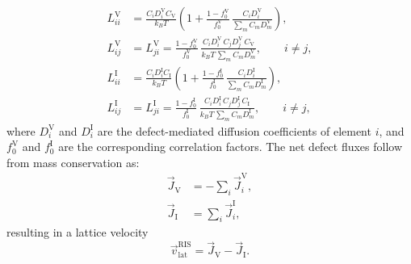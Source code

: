 \documentclass[3p,times]{elsarticle} %
\newcommand{\Vac}{\mathrm{V}}          %
\newcommand{\Int}{\mathrm{I}}          %
\newcommand{\lat}{\mathrm{lat}}
\begin{document}
\begin{align}
L_{ii}^{\Vac} &= \frac{C_iD_i^{\Vac}C_{\Vac}}{k_BT}
  \left(1+\frac{1-f_0^{\Vac}}{f_0^{\Vac}}\,
  \frac{C_iD_i^{\Vac}}{\sum_m C_mD_m^{\Vac}}\right),
\label{eq:onsager-vac-diag}\\
L_{ij}^{\Vac} &= L_{ji}^{\Vac}
  = \frac{1-f_0^{\Vac}}{f_0^{\Vac}}\,
    \frac{C_iD_i^{\Vac}\,C_jD_j^{\Vac}\,C_{\Vac}}
         {k_BT\,\sum_m C_mD_m^{\Vac}},
    \qquad i\neq j,
\label{eq:onsager-vac-off}\\
L_{ii}^{\Int} &= \frac{C_iD_i^{\Int}C_{\Int}}{k_BT}
  \left(1+\frac{1-f_0^{\Int}}{f_0^{\Int}}\,
  \frac{C_iD_i^{\Int}}{\sum_m C_mD_m^{\Int}}\right),
\label{eq:onsager-int-diag}\\
L_{ij}^{\Int} &= L_{ji}^{\Int}
  = \frac{1-f_0^{\Int}}{f_0^{\Int}}\,
    \frac{C_iD_i^{\Int}\,C_jD_j^{\Int}\,C_{\Int}}
         {k_BT\,\sum_m C_mD_m^{\Int}},
    \qquad i\neq j,
\label{eq:onsager-int-off}
\end{align}
where \(D_i^{\Vac}\) and \(D_i^{\Int}\) are the defect-mediated diffusion
coefficients of element \(i\), and \(f_0^{\Vac}\) and \(f_0^{\Int}\) are the
corresponding correlation factors. The net defect fluxes follow from mass conservation as:
\begin{align}
\vec{J}_{\Vac} &= -\sum_i \vec{J}_i^{\Vac},
\label{eq:netflux-vac}\\
\vec{J}_{\Int} &= \sum_i \vec{J}_i^{\Int},
\label{eq:netflux-int}
\end{align}
resulting in a lattice velocity
\begin{equation}
\vec{v}_{\lat}^{\mathrm{RIS}}=\vec{J}_{\Vac}-\vec{J}_{\Int} .
\label{eq:vlat-ris}
\end{equation}
\end{document}
